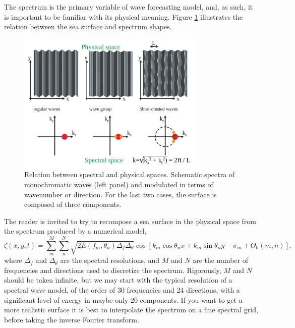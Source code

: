  The spectrum is the primary variable of wave forecasting model, and, as such, it is important to be familiar with its physical meaning. 
 Figure \ref{fig:spectres101}
 illustrates the relation between the sea surface and spectrum shapes.
\begin{figure}[!htbp]
\centerline{\includegraphics[width=0.8\textwidth]{FIGS_CH_MEASUREMENTS/spectres101_en.pdf}}
\caption{Relation between spectral and physical spaces. Schematic spectra of monochromatic waves (left panel) and modulated in terms 
of wavenumber or direction. For the last two cases, the surface is composed of three components.\label{fig:spectres101}}
\end{figure}
The reader is invited to try to recompose a sea surface in the physical space from the spectrum produced by a numerical model,
\begin{equation}
\zeta(x,y,t)=\sum_{m}^{M}\sum_{n}^{N}\sqrt{2E(f_m,\theta_n)\Delta_f \Delta_\theta} \cos\left[ k_m \cos \theta_n x +k_m \sin \theta_n  y- \sigma_m + \Theta_0(m,n)\right],
\label{eq3.11}
\end{equation}
where $\Delta_f$ and $\Delta_\theta$ are the spectral resolutions, and $M$ and $N$ are the number of frequencies and directions used to discretize the spectrum.  
Rigorously, $M$ and $N$ should be taken infinite, but we may start with the typical resolution of  a 
spectral wave model, of the order of 30 frequencies and 24 directions, with a significant level of energy in maybe only 20 components. If you want to get a more realistic surface it is best to interpolate the spectrum on a fine spectral grid, before taking the inverse Fourier transform. 

